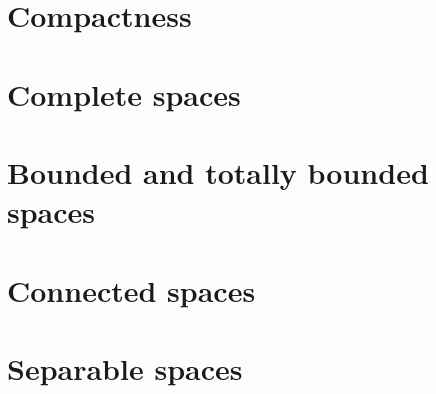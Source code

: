 \section{Compactness}

\section{Complete spaces}

\section{Bounded and totally bounded spaces}

\section{Connected spaces}

\section{Separable spaces}
